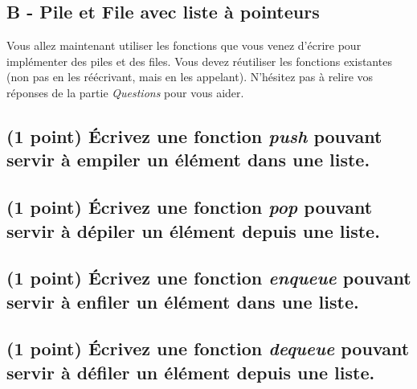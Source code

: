 \documentclass[11pt,a4paper]{article}
\begin{document}


\subsection*{B - Pile et File avec liste à pointeurs}

Vous allez maintenant utiliser les fonctions que vous venez d'écrire pour implémenter des piles et des files.
Vous devez réutiliser les fonctions existantes (non pas en les réécrivant, mais en les appelant).
N'hésitez pas à relire vos réponses de la partie \textit{Questions} pour vous aider.

\subsection{(1 point) \'Ecrivez une fonction \og \textit{push} \fg{} pouvant servir à empiler un élément dans une liste. }

\bigskip

\begin{center}
\end{center}

\newpage

\subsection{(1 point) \'Ecrivez une fonction \og \textit{pop} \fg{} pouvant servir à dépiler un élément depuis une liste. }

\bigskip

\begin{center}
\end{center}

\bigskip




\subsection{(1 point) \'Ecrivez une fonction \og \textit{enqueue} \fg{} pouvant servir à enfiler un élément dans une liste. }

\bigskip

\begin{center}
\end{center}


\subsection{(1 point) \'Ecrivez une fonction \og \textit{dequeue} \fg{} pouvant servir à défiler un élément depuis une liste. }

\bigskip

\begin{center}
\end{center}

\bigskip
\end{document}
